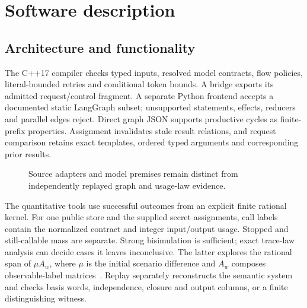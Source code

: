 \documentclass[preprint,12pt,a4paper]{elsarticle}
\begin{document}
\section{Software description}
\subsection{Architecture and functionality}
The C++17 compiler checks typed inputs, resolved model contracts, flow policies, literal-bounded retries and conditional token bounds. A bridge exports its admitted request/control fragment. A separate Python frontend accepts a documented static LangGraph subset; unsupported statements, effects, reducers and parallel edges reject. Direct graph JSON supports productive cycles as finite-prefix properties. Assignment invalidates stale result relations, and request comparison retains exact templates, ordered typed arguments and corresponding prior results.

\begin{figure}[ht]
\centering
{}
\caption{Source adapters and model premises remain distinct from independently replayed graph and usage-law evidence.}
\label{fig:architecture}
\end{figure}

The quantitative tools use successful outcomes from an explicit finite rational kernel. For one public store and the supplied secret assignments, call labels contain the normalized contract and integer input/output usage. Stopped and still-callable mass are separate. Strong bisimulation is sufficient; exact trace-law analysis can decide cases it leaves inconclusive. The latter explores the rational span of $\mu A_w$, where $\mu$ is the initial scenario difference and $A_w$ composes observable-label matrices~\cite{kiefer}. Replay separately reconstructs the semantic system and checks basis words, independence, closure and output columns, or a finite distinguishing witness.
\end{document}
